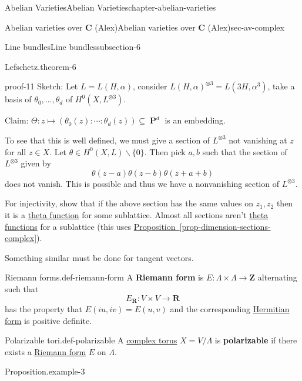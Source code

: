 \documentclass[oneside,10pt,]{book}
\newcommand{\terminology}[1]{\textbf{#1}}
\numberwithin{equation}{section}
\newcommand{\ZZ}{\mathbf{Z}}
\newcommand{\RR}{\mathbf{R}}
\newcommand{\CC}{\mathbf{C}}
\DeclareMathOperator{\PP}{\mathbf{P}}
\begin{document}
\begin{chapterptx}{Abelian Varieties}{}{Abelian Varieties}{}{}{chapter-abelian-varieties}
\begin{sectionptx}{Abelian varieties over \(\CC\) (Alex)}{}{Abelian varieties over \(\CC\) (Alex)}{}{}{sec-av-complex}
\begin{subsectionptx}{Line bundles}{}{Line bundles}{}{}{subsection-6}
\begin{theorem}{Lefschetz.}{}{theorem-6}
\end{theorem}
\begin{proofptx}{}{proof-11}
\hypertarget{p-66}{}%
Sketch: Let \(L = L(H,\alpha)\), consider \(L(H,\alpha)^{\otimes 3} = L(3H, \alpha^3)\), take a basis of \(\theta_0,\ldots, \theta_d\) of \(H^0(X, L^{\otimes 3})\).%
\par
\hypertarget{p-67}{}%
Claim: \(\Theta\colon z\mapsto (\theta_0(z) :\cdots :\theta_d (z)) \subseteq \PP^d\) is an embedding.%
\par
\hypertarget{p-68}{}%
To see that this is well defined, we must give a section of \(L^{\otimes 3}\) not vanishing at \(z\) for all \(z\in X\). Let \(\theta \in H^0(X,L)\smallsetminus \{0\}\). Then pick \(a,b\) such that the section of \(L^{\otimes 3}\) given by%
\begin{equation*}
\theta(z-a)\theta(z-b) \theta(z+ a+b)
\end{equation*}
does not vanish. This is possible and thus we have a nonvanishing section of \(L^{\otimes 3}\).%
\par
\hypertarget{p-69}{}%
For injectivity, show that if the above section has the same values on \(z_1,z_2\) then it is a \hyperref[def-theta-function]{theta function} for some sublattice. Almost all sections aren't \hyperref[def-theta-function]{theta functions} for a sublattice (this uses \hyperref[prop-dimension-sections-complex]{Proposition~\ref{prop-dimension-sections-complex}}).%
\par
\hypertarget{p-70}{}%
Something similar must be done for tangent vectors.%
\end{proofptx}
\begin{definition}{Riemann forms.}{def-riemann-form}%
\hypertarget{p-71}{}%
A \terminology{Riemann form} is \(E\colon \Lambda \times \Lambda \to \ZZ\) alternating such that%
\begin{equation*}
E_\RR \colon V\times V\to \RR
\end{equation*}
has the property that \(E(iu,iv) = E(u,v)\) and  the corresponding \hyperref[def-herm-form]{Hermitian form} is positive definite.%
\end{definition}
\begin{definition}{Polarizable tori.}{def-polarizable}%
\hypertarget{p-72}{}%
A \hyperref[def-complex-torus]{complex torus} \(X = V/\Lambda\) is \terminology{polarizable} if there exists a \hyperref[def-riemann-form]{Riemann form} \(E\) on \(\Lambda\).%
\end{definition}
\begin{example}{Proposition.}{example-3}%

\end{example}
\end{subsectionptx}
\end{sectionptx}
\end{chapterptx}
\end{document}
